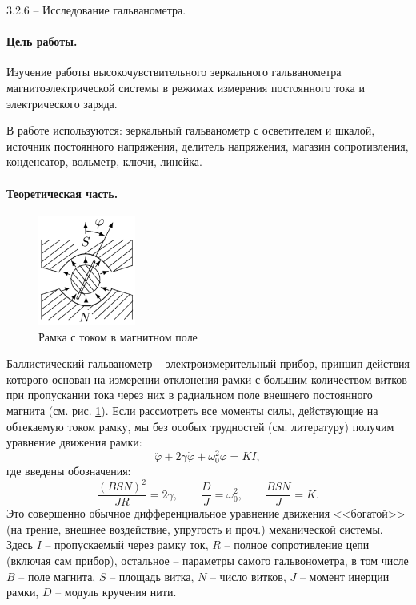 \documentclass{lab_class}
\begin{document}
{\Large 3.2.6 -- Исследование гальванометра.}

\paragraph{Цель работы.}
Изучение работы высокочувствительного зеркального гальванометра магнитоэлектрической системы в режимах измерения постоянного тока и электрического заряда.

В работе используются: зеркальный гальванометр с осветителем и шкалой, источник постоянного напряжения, делитель напряжения, магазин сопротивления, конденсатор, вольметр, ключи, линейка.

\paragraph{Теоретическая часть.}

\begin{figure}
	\centering
	\includegraphics[width=3.2cm]{galvanometer.png}
	\caption{Рамка с током в магнитном поле}
	\label{fig:galvano}
\end{figure}

Баллистический гальванометр -- электроизмерительный прибор, принцип действия которого основан на измерении отклонения рамки с большим количеством витков при пропускании тока через них в радиальном поле внешнего постоянного магнита (см. рис. \ref{fig:galvano}). Если рассмотреть все моменты силы, действующие на обтекаемую током рамку, мы без особых трудностей (см. литературу) получим уравнение движения рамки:
\begin{equation}\label{eq:galvano_movement}
	\ddot{\varphi} + 2 \gamma \dot{\varphi} + \omega_0^2 \varphi = KI,
\end{equation}
где введены обозначения:
\begin{equation*}
	\frac{(BSN)^2}{JR} = 2 \gamma, \qquad \frac{D}{J} = \omega_0^2, \qquad \frac{BSN}{J} = K.
\end{equation*}
Это совершенно обычное дифференциальное уравнение движения <<богатой>> (на трение, внешнее воздействие, упругость и проч.) механической системы. Здесь $I$ -- пропускаемый через рамку ток, $R$ -- полное сопротивление цепи (включая сам прибор), остальное -- параметры самого гальвонометра, в том числе $B$ -- поле магнита, $S$ -- площадь витка, $N$ -- число витков, $J$ -- момент инерции рамки, $D$ -- модуль кручения нити. 
\end{document}
